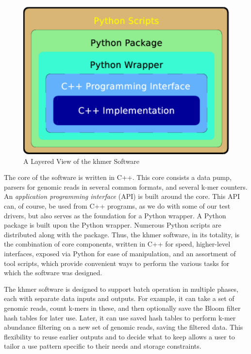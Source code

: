 \documentclass{article}
\begin{document}
\begin{figure}[ht!]
\centering
\includegraphics[scale=0.6]{layers.pdf}
\caption{A Layered View of the khmer Software}
\label{khmerLayers}
\end{figure}

The core of the software is written in C++. This core consists a data pump, parsers for genomic reads in several common formats, and several k-mer counters. An \textit{application programming interface} (API) is built around the core. This API can, of course, be used from C++ programs, as we do with some of our test drivers, but also serves as the foundation for a Python wrapper. A Python package is built upon the Python wrapper. Numerous Python scripts are distributed along with the package. Thus, the khmer software, in its totality, is the combination of core components, written in C++ for speed, higher-level interfaces, exposed via Python for ease of manipulation, and an assortment of tool scripts, which provide convenient ways to perform the various tasks for which the software was designed.

The khmer software is designed to support batch operation in multiple phases, each with separate data inputs and outputs. For example, it can take a set of genomic reads, count k-mers in these, and then optionally save the Bloom filter hash tables for later use. Later, it can use saved hash tables to perform k-mer abundance filtering on a new set of genomic reads, saving the filtered data. This flexibility to reuse earlier outputs and to decide what to keep allows a user to tailor a use pattern specific to their needs and storage constraints.
\end{document}
